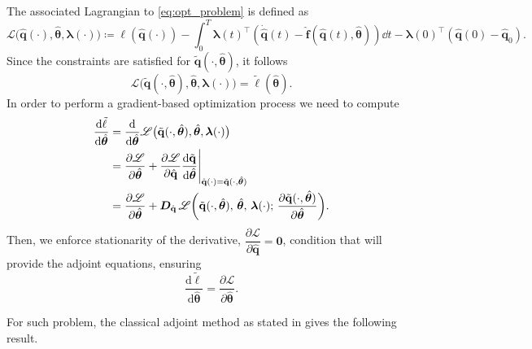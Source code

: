 The associated Lagrangian to \eqref{eq:opt_problem} is defined as\\
\begin{equation}
        \mathscr{L}\bigl(\hat{\mathbf{q}}(\cdot),\hat{\bm{\theta}},\bm{\lambda}(\cdot)\bigr) \coloneqq \ell(\hat{\mathbf{q}}(\cdot)) - \int_0^T \bm{\lambda}(t)^{\top}\left( \dot{\hat{\mathbf{q}}}(t)-\hat{\mathbf{f}}(\hat{\mathbf{q}}(t),\hat{\bm{\theta}}) \right)\dd t - \bm{\lambda}(0)^{\top}(\hat{\mathbf{q}}(0)-\hat{\mathbf{q}}_0).
        \label{eq:lagrange_cost}
    \end{equation}
Since the constraints are satisfied for $\tilde{\mathbf{q}}(\cdot,\hat{\bm{\theta}})$, it follows\\
$$\mathscr{L}\bigl(\tilde{\mathbf{q}}(\cdot,\hat{\bm{\theta}}),\hat{\bm{\theta}}, \bm{\lambda}(\cdot)\bigr) = \tilde{\ell} (\hat{\bm{\theta}}).$$
In order to perform a gradient-based optimization process we need to compute\\
\begin{align*}
    \dv{\tilde{\ell}}{\hat{\bm{\theta}}} &= \dv{}{\hat{\bm{\theta}}} \mathscr{L}\bigl(\tilde{\mathbf{q}}(\cdot,\hat{\bm{\theta}}),\hat{\bm{\theta}},\bm{\lambda}(\cdot)\bigr) \\
    &= \dfrac{\partial\mathscr{L}}{\partial\hat{\bm{\theta}}} + \dfrac{\partial\mathscr{L}}{\partial\hat{\mathbf{q}}} \dfrac{\textrm{d}\tilde{\mathbf{q}}}{\textrm{d}\hat{\bm{\theta}}}\Bigg\vert_{\hat{\mathbf{q}}(\cdot) = \tilde{\mathbf{q}}(\cdot, \hat{\bm{\theta}} ) } \\
    &= 
  \frac{\partial\mathscr{L}}{\partial \hat{\bm{\theta}}}+
  \bm{D}_{\hat{\mathbf{q}}}\,\mathscr{L}\biggl(\tilde{\mathbf{q}}(\cdot,\hat{\bm{\theta}}),\,\hat{\bm{\theta}},\,\bm{\lambda}(\cdot);\,
    \dfrac{\partial\tilde{\mathbf{q}}(\cdot,\hat{\bm{\theta}})}{\partial\hat{\bm{\theta}}}
  \biggr).
\end{align*}
Then, we enforce stationarity of the derivative, $\dfrac{\partial\mathscr{L}}{\partial\hat{\mathbf{q}}} = \bm{0}$, condition that will provide the adjoint equations, ensuring\\
\begin{equation}
  \label{eq:equal_grad}
  \frac{\mathrm{d}\tilde{\ell}}{\mathrm{d}\hat{\bm{\theta}}}
  = \frac{\partial\mathscr{L}}{\partial\hat{\bm{\theta}}}.
\end{equation}

For such problem, the classical adjoint method as stated in \cite{bradley2024pde,luchini2024introduction} gives the following result.

